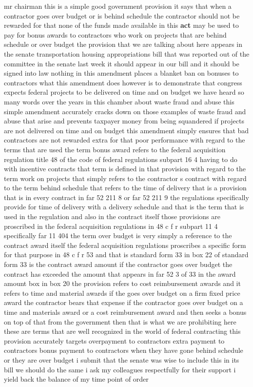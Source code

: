 \documentclass{article}
\begin{document}
mr chairman this is a simple good government provision it says that when a contractor goes over budget or is behind schedule the contractor should not be rewarded for that none of the funds made available in this {\bf \color{red} act} may be used to pay for bonus awards to contractors who work on projects that are behind schedule or over budget the provision that we are talking about here appears in the senate transportation housing appropriations bill that was reported out of the committee in the senate last week it should appear in our bill and it should be signed into law nothing in this amendment places a blanket ban on bonuses to contractors what this amendment does however is to demonstrate that congress expects federal projects to be delivered on time and on budget we have heard so many words over the years in this chamber about waste fraud and abuse this simple amendment accurately cracks down on those examples of waste fraud and abuse that arise and prevents taxpayer money from being squandered if projects are not delivered on time and on budget this amendment simply ensures that bad contractors are not rewarded extra for that poor performance with regard to the terms that are used the term bonus award refers to the federal acquisition regulation title 48 of the code of federal regulations subpart 16 4 having to do with incentive contracts that term is defined in that provision with regard to the term work on projects that simply refers to the contractor s contract with regard to the term behind schedule that refers to the time of delivery that is a provision that is in every contract in far 52 211 8 or far 52 211 9 the regulations specifically provide for time of delivery with a delivery schedule and that is the term that is used in the regulation and also in the contract itself those provisions are proscribed in the federal acquisition regulations in 48 c f r subpart 11 4 specifically far 11 404 the term over budget is very simply a reference to the contract award itself the federal acquisition regulations proscribes a specific form for that purpose in 48 c f r 53 and that is standard form 33 in box 22 of standard form 33 is the contract award amount if the contractor goes over budget the contract has exceeded the amount that appears in far 52 3 of 33 in the award amount box in box 20 the provision refers to cost reimbursement awards and it refers to time and material awards if the goes over budget on a firm fixed price award the contractor bears that expense if the contractor goes over budget on a time and materials award or a cost reimbursement award and then seeks a bonus on top of that from the government then that is what we are prohibiting here these are terms that are well recognized in the world of federal contracting this provision accurately targets overpayment to contractors extra payment to contractors bonus payment to contractors when they have gone behind schedule or they are over budget i submit that the senate was wise to include this in its bill we should do the same i ask my colleagues respectfully for their support i yield back the balance of my time point of order
\end{document}

